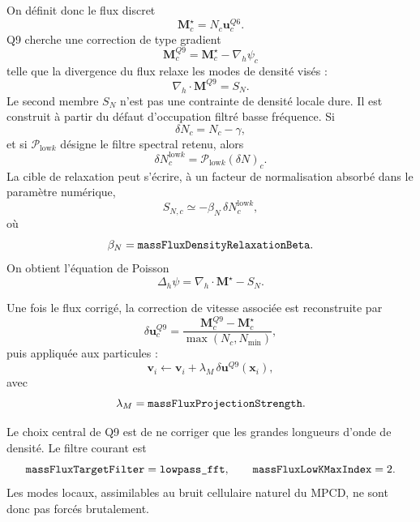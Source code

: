\documentclass[11pt,a4paper]{article}
\begin{document}
On définit donc le flux discret
\begin{equation}
  \bm{M}_c^{\star}=N_c\bm{u}_c^{Q6}.
\end{equation}
Q9 cherche une correction de type gradient
\begin{equation}
  \bm{M}_c^{Q9}=\bm{M}_c^{\star}-\nabla_h \psi_c
\end{equation}
telle que la divergence du flux relaxe les modes de densité visés :
\begin{equation}
  \nabla_h\cdot \bm{M}^{Q9}=S_N.
\end{equation}
Le second membre $S_N$ n'est pas une contrainte de densité locale dure. Il est construit à partir du défaut d'occupation filtré basse fréquence. Si
\begin{equation}
  \delta N_c = N_c-\gamma,
\end{equation}
et si $\mathcal{P}_{\mathrm{low}k}$ désigne le filtre spectral retenu, alors
\begin{equation}
  \delta N_c^{\mathrm{low}k}=\mathcal{P}_{\mathrm{low}k}(\delta N)_c.
\end{equation}
La cible de relaxation peut s'écrire, à un facteur de normalisation absorbé dans le paramètre numérique,
\begin{equation}
  S_{N,c} \simeq -\beta_N\,\delta N_c^{\mathrm{low}k},
\end{equation}
où
\begin{equation}
  \beta_N = \verb|massFluxDensityRelaxationBeta|.
\end{equation}
On obtient l'équation de Poisson
\begin{equation}
  \Delta_h\psi = \nabla_h\cdot \bm{M}^{\star}-S_N.
\end{equation}

Une fois le flux corrigé, la correction de vitesse associée est reconstruite par
\begin{equation}
  \delta\bm{u}_c^{Q9}=\frac{\bm{M}_c^{Q9}-\bm{M}_c^{\star}}{\max(N_c,N_{\min})},
\end{equation}
puis appliquée aux particules :
\begin{equation}
  \bm{v}_i\leftarrow \bm{v}_i + \lambda_M\,\delta\bm{u}^{Q9}(\bm{x}_i),
\end{equation}
avec
\begin{equation}
  \lambda_M=\verb|massFluxProjectionStrength|.
\end{equation}

Le choix central de Q9 est de ne corriger que les grandes longueurs d'onde de densité. Le filtre courant est
\begin{equation}
  \verb|massFluxTargetFilter|=\verb|lowpass_fft|,
  \qquad
  \verb|massFluxLowKMaxIndex|=2.
\end{equation}
Les modes locaux, assimilables au bruit cellulaire naturel du MPCD, ne sont donc pas forcés brutalement.
\end{document}
